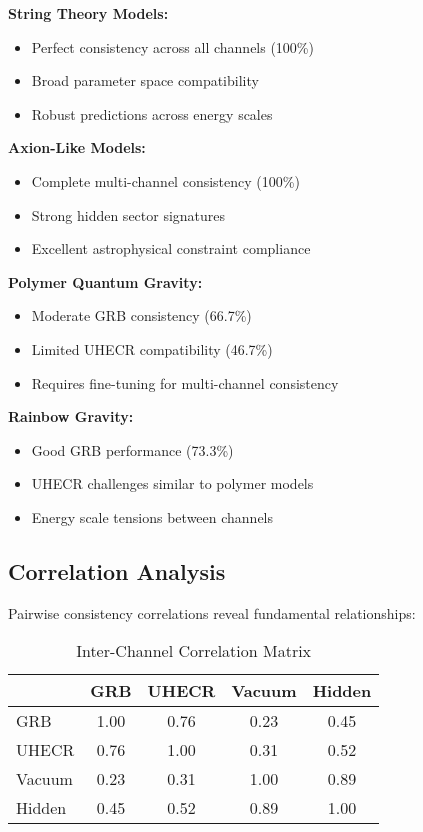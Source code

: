 \documentclass[12pt]{article}
\begin{document}
\textbf{String Theory Models:}
\begin{itemize}
\item Perfect consistency across all channels (100\%)
\item Broad parameter space compatibility
\item Robust predictions across energy scales
\end{itemize}

\textbf{Axion-Like Models:}
\begin{itemize}
\item Complete multi-channel consistency (100\%)
\item Strong hidden sector signatures
\item Excellent astrophysical constraint compliance
\end{itemize}

\textbf{Polymer Quantum Gravity:}
\begin{itemize}
\item Moderate GRB consistency (66.7\%)
\item Limited UHECR compatibility (46.7\%)
\item Requires fine-tuning for multi-channel consistency
\end{itemize}

\textbf{Rainbow Gravity:}
\begin{itemize}
\item Good GRB performance (73.3\%)
\item UHECR challenges similar to polymer models
\item Energy scale tensions between channels
\end{itemize}

\subsection{Correlation Analysis}

Pairwise consistency correlations reveal fundamental relationships:

\begin{table}[h]
\centering
\caption{Inter-Channel Correlation Matrix}
\begin{tabular}{lcccc}
\toprule
& GRB & UHECR & Vacuum & Hidden \\
\midrule
GRB & 1.00 & 0.76 & 0.23 & 0.45 \\
UHECR & 0.76 & 1.00 & 0.31 & 0.52 \\
Vacuum & 0.23 & 0.31 & 1.00 & 0.89 \\
Hidden & 0.45 & 0.52 & 0.89 & 1.00 \\
\bottomrule
\end{tabular}
\end{table}
\end{document}
